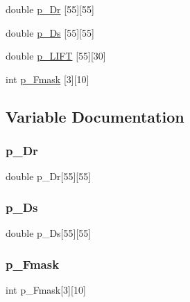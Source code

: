 \begin{DoxyCompactItemize}
\item 
double \hyperlink{a00530_ad6fa2e145cefafb939457faa473dc001}{p\+\_\+\+Dr} \mbox{[}55\mbox{]}\mbox{[}55\mbox{]}
\item 
double \hyperlink{a00530_a2776a66d462bb8044dd515a386783f74}{p\+\_\+\+Ds} \mbox{[}55\mbox{]}\mbox{[}55\mbox{]}
\item 
double \hyperlink{a00530_a6513581bd569e261c7ebcd58290d69b7}{p\+\_\+\+L\+I\+FT} \mbox{[}55\mbox{]}\mbox{[}30\mbox{]}
\item 
int \hyperlink{a00530_a26aabe66a1b23bac90824cd792bfdaa6}{p\+\_\+\+Fmask} \mbox{[}3\mbox{]}\mbox{[}10\mbox{]}
\end{DoxyCompactItemize}


\subsection{Variable Documentation}
\mbox{\label{a00530_ad6fa2e145cefafb939457faa473dc001}} 
\subsubsection{\texorpdfstring{p\+\_\+\+Dr}{p\_Dr}}
{\footnotesize\ttfamily double p\+\_\+\+Dr\mbox{[}55\mbox{]}\mbox{[}55\mbox{]}}

\mbox{\label{a00530_a2776a66d462bb8044dd515a386783f74}} 
\subsubsection{\texorpdfstring{p\+\_\+\+Ds}{p\_Ds}}
{\footnotesize\ttfamily double p\+\_\+\+Ds\mbox{[}55\mbox{]}\mbox{[}55\mbox{]}}

\mbox{\label{a00530_a26aabe66a1b23bac90824cd792bfdaa6}} 
\subsubsection{\texorpdfstring{p\+\_\+\+Fmask}{p\_Fmask}}
{\footnotesize\ttfamily int p\+\_\+\+Fmask\mbox{[}3\mbox{]}\mbox{[}10\mbox{]}}

